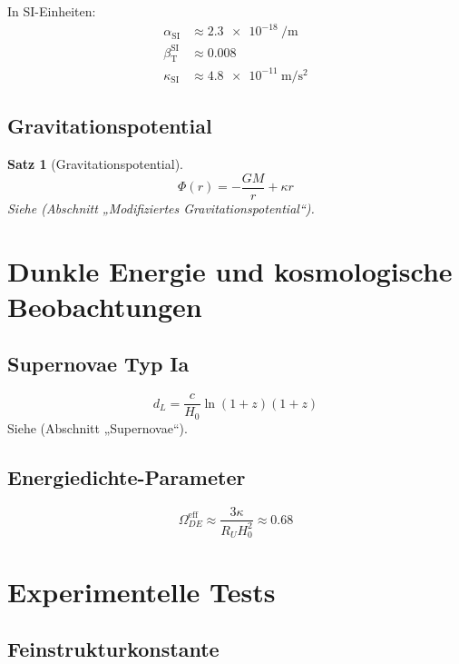 \documentclass[a4paper,12pt]{article}
\newtheorem{theorem}{Satz}[section]
\theoremstyle{definition}
\theoremstyle{remark}
\newcommand{\betaT}{\beta_{\text{T}}}
\begin{document}
In SI-Einheiten:
\begin{align}
	\alpha_{\text{SI}} &\approx \SI{2.3e-18}{\per\meter} \\
	\betaT^{\text{SI}} &\approx 0.008 \\
	\kappa_{\text{SI}} &\approx \SI{4.8e-11}{\meter\per\second\squared}
\end{align}

\subsection{Gravitationspotential}

\begin{theorem}[Gravitationspotential]
	\begin{equation}
		\Phi(r) = -\frac{G M}{r} + \kappa r
	\end{equation}
	Siehe \cite{pascher_galaxies_2025} (Abschnitt „Modifiziertes Gravitationspotential“).
\end{theorem}

\section{Dunkle Energie und kosmologische Beobachtungen}

\subsection{Supernovae Typ Ia}

\begin{equation}
	d_L = \frac{c}{H_0} \ln(1+z) (1+z)
\end{equation}
Siehe \cite{pascher_messdifferenzen_2025} (Abschnitt „Supernovae“).

\subsection{Energiedichte-Parameter}

\begin{equation}
	\Omega_{DE}^{\text{eff}} \approx \frac{3 \kappa}{R_U H_0^2} \approx 0.68
\end{equation}

\section{Experimentelle Tests}

\subsection{Feinstrukturkonstante}
\end{document}
